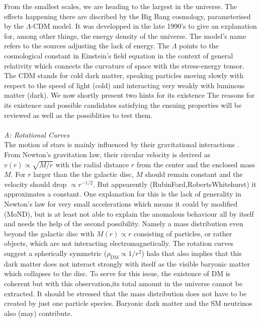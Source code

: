 From the smallest scales, we are heading to the largest in the universe. The effects happening there are discribed by the Big Bang cosmology, parameterised
by the $\Lambda$-CDM model. It was developped in the late 1990's \cite{LambdaCDM} to give an explanation for, among other things, the energy density of the 
universe. The model's name refers to the sources adjusting the lack of energy. The $\Lambda$ points to the cosmological constant in Einstein's field equation
in the context of general relativity which connects the curvature of space with the stress-energy tensor.
The CDM stands for cold dark matter, speaking particles moving slowly with respect to the speed of light (cold) and interacting very weakly with luminous
matter (dark). We now shortly present two hints for its existence
The reasons for its existence and possible candidates satisfying the ensuing properties will be reviewed as well as the possiblities to test them.\\
\\ \textit{A: Rotational Curves}\\
\noindent The motion of stars is mainly influenced by their gravitational interactions \cite{LectDMLis}. From Newton's gravitation law, their circular velocity 
is derived as
$v(r)\propto\sqrt{M/r}$ with the radial distance $r$ from the center and the enclosed mass $M$. For $r$ larger than the the galactic disc, $M$ should remain
constant and the velocity should drop $\propto r^{-1/2}$. But appearently (RubinFord,RobertsWhitehurst) it approximates a constant. One explanation for this
is the lack of generality in Newton's law for very small accelerations which means it could by modified (MoND), but is at least not able to 
explain the anomalous behaviour all by itself \cite{11015122}\cite{160607790} and needs the help of the second possibility. Namely a mass distribution even beyond the galactic
disc with $M(r)\propto r$ consisting of particles, or rather objects, which are not interacting electromagnetically. The rotation curves suggest a 
spherically symmetric ($\rho_\text{DM}\propto 1/r^2$) halo that also implies that this dark matter does not interact strongly with itself as the visible 
baryonic matter which collapses to the disc. To serve for this issue, the existence of DM is coherent but with this observation,its total amount in the 
universe cannot be extracted. It should be stressed that the mass distribution does not have to be created by just one particle species. Baryonic dark matter
and the SM neutrinos also (may) contribute. \\
